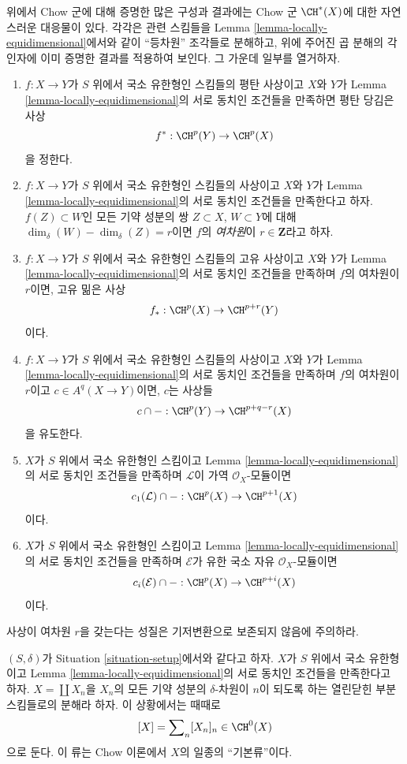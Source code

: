 \medskip\noindent
위에서 Chow 군에 대해 증명한 많은 구성과 결과에는 Chow 군
$\CH^*(X)$에 대한 자연스러운 대응물이 있다. 각각은 관련 스킴들을
Lemma \ref{lemma-locally-equidimensional}에서와 같이 ``등차원'' 조각들로
분해하고, 위에 주어진 곱 분해의 각 인자에 이미 증명한 결과를
적용하여 보인다. 그 가운데 일부를 열거하자.
\begin{enumerate}
\item $f : X \to Y$가 $S$ 위에서 국소 유한형인 스킴들의 평탄 사상이고
$X$와 $Y$가 Lemma \ref{lemma-locally-equidimensional}의 서로 동치인
조건들을 만족하면 평탄 당김은 사상
$$
f^* : \CH^p(Y) \to \CH^p(X)
$$
을 정한다.
\item $f : X \to Y$가 $S$ 위에서 국소 유한형인 스킴들의 사상이고
$X$와 $Y$가 Lemma \ref{lemma-locally-equidimensional}의 서로 동치인
조건들을 만족한다고 하자. $f(Z) \subset W$인 모든 기약 성분의 쌍
$Z \subset X$, $W \subset Y$에 대해
$\dim_\delta(W) - \dim_\delta(Z) = r$이면 $f$의
{\it 여차원}이 $r \in \mathbf{Z}$라고 하자.
\item $f : X \to Y$가 $S$ 위에서 국소 유한형인 스킴들의 고유 사상이고
$X$와 $Y$가 Lemma \ref{lemma-locally-equidimensional}의 서로 동치인
조건들을 만족하며 $f$의 여차원이 $r$이면, 고유 밂은 사상
$$
f_* : \CH^p(X) \to \CH^{p + r}(Y)
$$
이다.
\item $f : X \to Y$가 $S$ 위에서 국소 유한형인 스킴들의 사상이고
$X$와 $Y$가 Lemma \ref{lemma-locally-equidimensional}의 서로 동치인
조건들을 만족하며 $f$의 여차원이 $r$이고
$c \in A^q(X \to Y)$이면, $c$는 사상들
$$
c \cap -  : \CH^p(Y) \to \CH^{p + q - r}(X)
$$
을 유도한다.
\item $X$가 $S$ 위에서 국소 유한형인 스킴이고 Lemma
\ref{lemma-locally-equidimensional}의 서로 동치인 조건들을 만족하며
$\mathcal{L}$이 가역 $\mathcal{O}_X$-모듈이면
$$
c_1(\mathcal{L}) \cap - : \CH^p(X) \to \CH^{p + 1}(X)
$$
이다.
\item $X$가 $S$ 위에서 국소 유한형인 스킴이고 Lemma
\ref{lemma-locally-equidimensional}의 서로 동치인 조건들을 만족하며
$\mathcal{E}$가 유한 국소 자유 $\mathcal{O}_X$-모듈이면
$$
c_i(\mathcal{E}) \cap - : \CH^p(X) \to \CH^{p + i}(X)
$$
이다.
\end{enumerate}
사상이 여차원 $r$을 갖는다는 성질은 기저변환으로 보존되지 않음에
주의하라.

\begin{remark}
\label{remark-fundamental-class}
$(S, \delta)$가 Situation \ref{situation-setup}에서와 같다고 하자.
$X$가 $S$ 위에서 국소 유한형이고 Lemma
\ref{lemma-locally-equidimensional}의 서로 동치인 조건들을 만족한다고
하자. $X = \coprod X_n$을 $X_n$의 모든 기약 성분의 $\delta$-차원이
$n$이 되도록 하는 열린닫힌 부분스킴들로의 분해라 하자. 이 상황에서는
때때로
$$
[X] = \sum\nolimits_n [X_n]_n \in \CH^0(X)
$$
으로 둔다. 이 류는 Chow 이론에서 $X$의 일종의 ``기본류''이다.
\end{remark}




